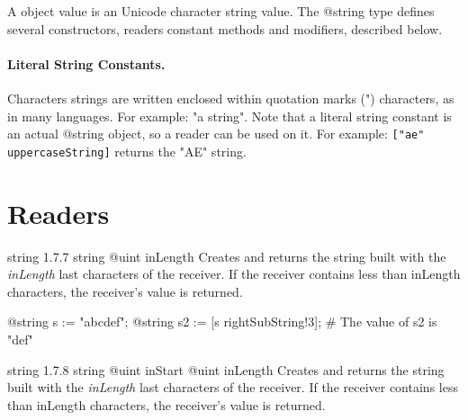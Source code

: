 

A  object value is an Unicode character string value. The @string type defines several constructors, readers constant methods and modifiers, described below.

\paragraph{Literal String Constants.}

Characters strings are written enclosed within quotation marks (") characters, as in many languages. For example: "a string". Note that a literal string constant is an actual @string object, so a reader can be used on it. For example: \lstinline[language=galgas]{["ae" uppercaseString]} returns the "AE" string.

\section{Readers}

{string}
{1.7.7}
{string}
{@uint inLength}
{Creates and returns the string built with the \emph{inLength} last characters of the receiver. If the receiver contains less than inLength characters, the receiver’s value is returned.}
{}

\begin{exemple}
@string s := "abcdef";
@string s2 := [s rightSubString!3]; # The value of s2 is "def"
\end{exemple}

{string}
{1.7.8}
{string}
{@uint inStart}
{@uint inLength}
{Creates and returns the string built with the \emph{inLength} last characters of the receiver. If the receiver contains less than inLength characters, the receiver’s value is returned.}
{}


